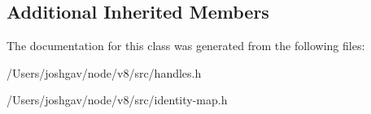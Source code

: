 \subsection*{Additional Inherited Members}


The documentation for this class was generated from the following files\+:\begin{DoxyCompactItemize}
\item 
/\+Users/joshgav/node/v8/src/handles.\+h\item 
/\+Users/joshgav/node/v8/src/identity-\/map.\+h\end{DoxyCompactItemize}
